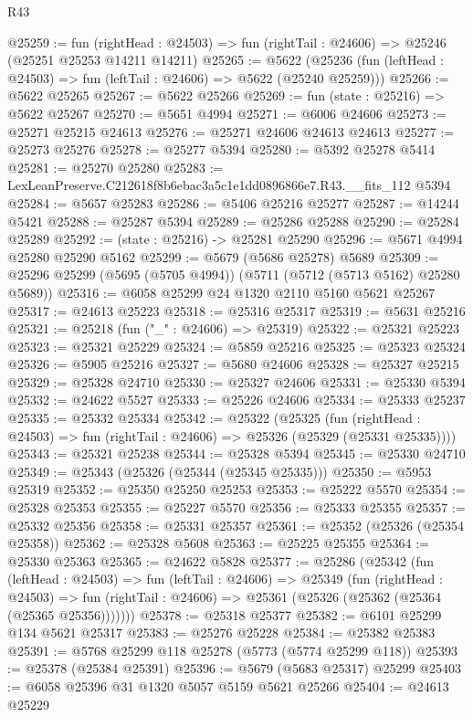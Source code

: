 \begin{lexlean}{R43}
\begin{coremodule}
@25259 := fun (rightHead : @24503) =>
  fun (rightTail : @24606) => @25246 (@25251 @25253 @14211 @14211)
@25265 := @5622
    (@25236 (fun (leftHead : @24503) => fun (leftTail : @24606) => @5622 (@25240 @25259)))
@25266 := @5622 @25265
@25267 := @5622 @25266
@25269 := fun (state : @25216) => @5622 @25267
@25270 := @5651 @4994
@25271 := @6006 @24606
@25273 := @25271 @25215 @24613
@25276 := @25271 @24606 @24613 @24613
@25277 := @25273 @25276
@25278 := @25277 @5394
@25280 := @5392 @25278 @5414
@25281 := @25270 @25280
@25283 := LexLeanPreserve.C212618f8b6ebac3a5c1e1dd0896866e7.R43.__fits_112 @5394
@25284 := @5657 @25283
@25286 := @5406 @25216 @25277
@25287 := @14244 @5421
@25288 := @25287 @5394
@25289 := @25286 @25288
@25290 := @25284 @25289
@25292 := (state : @25216) -> @25281 @25290
@25296 := @5671 @4994 @25280 @25290 @5162
@25299 := @5679 (@5686 @25278) @5689
@25309 := @25296 @25299 (@5695 (@5705 @4994)) (@5711 (@5712 (@5713 @5162) @25280 @5689))
@25316 := @6058 @25299 @24 @1320 @2110 @5160 @5621 @25267
@25317 := @24613 @25223
@25318 := @25316 @25317
@25319 := @5631 @25216
@25321 := @25218 (fun ("_" : @24606) => @25319)
@25322 := @25321 @25223
@25323 := @25321 @25229
@25324 := @5859 @25216
@25325 := @25323 @25324
@25326 := @5905 @25216
@25327 := @5680 @24606
@25328 := @25327 @25215
@25329 := @25328 @24710
@25330 := @25327 @24606
@25331 := @25330 @5394
@25332 := @24622 @5527
@25333 := @25226 @24606
@25334 := @25333 @25237
@25335 := @25332 @25334
@25342 := @25322
    (@25325
      (fun (rightHead : @24503) => fun (rightTail : @24606) => @25326 (@25329 (@25331 @25335))))
@25343 := @25321 @25238
@25344 := @25328 @5394
@25345 := @25330 @24710
@25349 := @25343 (@25326 (@25344 (@25345 @25335)))
@25350 := @5953 @25319
@25352 := @25350 @25250 @25253
@25353 := @25222 @5570
@25354 := @25328 @25353
@25355 := @25227 @5570
@25356 := @25333 @25355
@25357 := @25332 @25356
@25358 := @25331 @25357
@25361 := @25352 (@25326 (@25354 @25358))
@25362 := @25328 @5608
@25363 := @25225 @25355
@25364 := @25330 @25363
@25365 := @24622 @5828
@25377 := @25286
    (@25342
      (fun (leftHead : @24503) =>
      fun (leftTail : @24606) =>
      @25349
        (fun (rightHead : @24503) =>
        fun (rightTail : @24606) => @25361 (@25326 (@25362 (@25364 (@25365 @25356)))))))
@25378 := @25318 @25377
@25382 := @6101 @25299 @134 @5621 @25317
@25383 := @25276 @25228
@25384 := @25382 @25383
@25391 := @5768 @25299 @118 @25278 (@5773 (@5774 @25299 @118))
@25393 := @25378 (@25384 @25391)
@25396 := @5679 (@5683 @25317) @25299
@25403 := @6058 @25396 @31 @1320 @5057 @5159 @5621 @25266
@25404 := @24613 @25229

\end{coremodule}
\end{lexlean}

